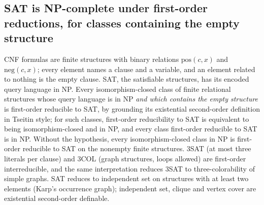 \begin{result}
\subsection{SAT is NP-complete under first-order reductions, for classes containing the empty structure}
CNF formulas are finite structures with binary relations $\mathrm{pos}(c,x)$ and
$\mathrm{neg}(c,x)$; every element names a clause and a variable, and an element related to
nothing is the empty clause. SAT, the satisfiable structures, has its encoded query language in
NP. Every isomorphism-closed class of finite relational structures whose query language is in NP
\emph{and which contains the empty structure} is first-order reducible to SAT, by grounding its
existential second-order definition in Tseitin style; for such classes, first-order reducibility
to SAT is equivalent to being isomorphism-closed and in NP, and every class first-order reducible
to SAT is in NP. Without the hypothesis, every isomorphism-closed class in NP is first-order
reducible to SAT on the nonempty finite structures. 3SAT (at most three literals per clause) and
3COL (graph structures, loops allowed) are first-order interreducible, and the same interpretation
reduces 3SAT to three-colorability of simple graphs. SAT reduces to independent set on structures
with at least two elements (Karp's occurrence graph); independent set, clique and vertex cover are
existential second-order definable.\citep[Chapter 7]{Immerman1999}\citep{Fagin1974}\citep{GareyJohnson1979}


\end{result}
